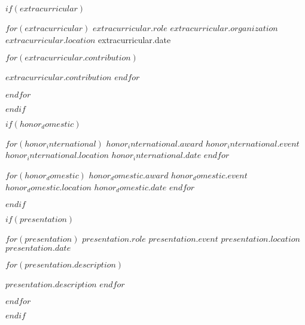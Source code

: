 \documentclass[11pt, a4paper]{awesome-cv}
\begin{document}

$if(extracurricular)$

\begin{cventries}
  $for(extracurricular)$
  \cventry
  {$extracurricular.role$} %
  {$extracurricular.organization$} %
  {$extracurricular.location$} %
  {extracurricular.date} %
  {
  \begin{cvitems}
    $for(extracurricular.contribution)$
    \item {$extracurricular.contribution$}
    $endfor$
  \end{cvitems}
  }
  $endfor$
\end{cventries}
$endif$


$if(honor_domestic)$


\begin{cvhonors}
  $for(honor_international)$
  \cvhonor
  {$honor_international.award$} %
  {$honor_international.event$} %
  {$honor_international.location$} %
  {$honor_international.date$} %
  $endfor$
\end{cvhonors}


\begin{cvhonors}
  $for(honor_domestic)$
  \cvhonor
  {$honor_domestic.award$} %
  {$honor_domestic.event$} %
  {$honor_domestic.location$} %
  {$honor_domestic.date$} %
  $endfor$
\end{cvhonors}
$endif$


$if(presentation)$

\begin{cventries}
  $for(presentation)$
  \cventry
  {$presentation.role$} %
  {$presentation.event$} %
  {$presentation.location$} %
  {$presentation.date$} %
  {
  \begin{cvitems}
    $for(presentation.description)$
    \item {$presentation.description$}
    $endfor$
  \end{cvitems}
  }
  $endfor$
\end{cventries}
$endif$
\end{document}
